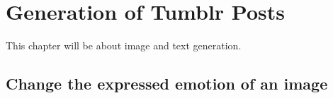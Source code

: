 \chapter{Generation of Tumblr Posts}

This chapter will be about image and text generation.

\section{Change the expressed emotion of an image}







